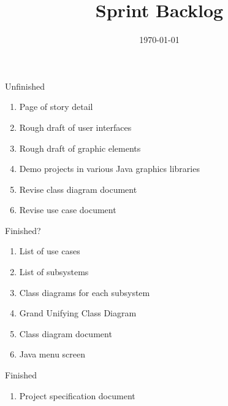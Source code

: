 \documentclass[12pt]{article}
\title{Sprint Backlog}
\date{\today}
\begin{document}
\maketitle

\begin{section}{Unfinished}
\begin{enumerate}
\item Page of story detail
\item Rough draft of user interfaces
\item Rough draft of graphic elements
\item Demo projects in various Java graphics libraries
\item Revise class diagram document
\item Revise use case document
\end{enumerate}
\end{section}

\begin{section}{Finished?}
\begin{enumerate}
\item List of use cases
\item List of subsystems
\item Class diagrams for each subsystem
\item Grand Unifying Class Diagram
\item Class diagram document
\item Java menu screen
\end{enumerate}
\end{section}

\begin{section}{Finished}
\begin{enumerate}
\item Project specification document
\end{enumerate}
\end{section}
\end{document}
